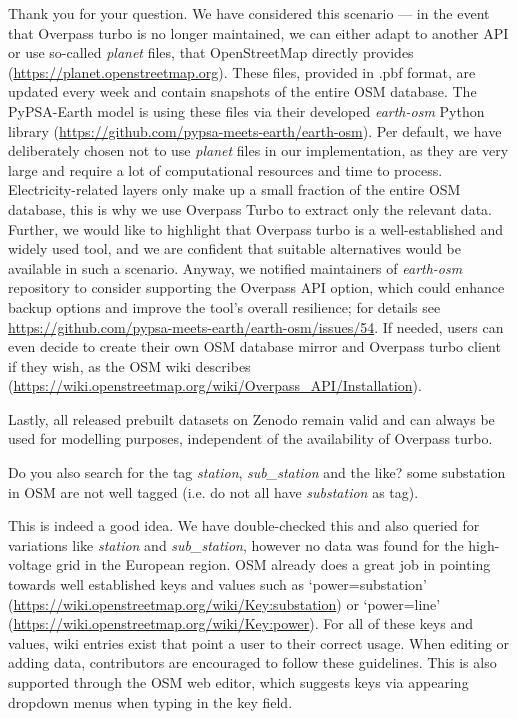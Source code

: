 \documentclass{response}
\begin{document}
\AR Thank you for your question. We have considered this scenario --- in the event that Overpass turbo is no longer maintained, we can either adapt to another API or use so-called \textit{planet} files, that OpenStreetMap directly provides (\href{https://planet.openstreetmap.org}{https://planet.openstreetmap.org}). These files, provided in .pbf format, are updated every week and contain snapshots of the entire OSM database. The PyPSA-Earth model is using these files via their developed \textit{earth-osm} Python library (\href{https://github.com/pypsa-meets-earth/earth-osm}{https://github.com/pypsa-meets-earth/earth-osm}). Per default, we have deliberately chosen not to use \textit{planet} files in our implementation, as they are very large and require a lot of computational resources and time to process. Electricity-related layers only make up a small fraction of the entire OSM database, this is why we use Overpass Turbo to extract only the relevant data. Further, we would like to highlight that Overpass turbo is a well-established and widely used tool, and we are confident that suitable alternatives would be available in such a scenario. Anyway, we notified maintainers of \textit{earth-osm} repository to consider supporting the Overpass API option, which could enhance backup options and improve the tool's overall resilience; for details see \href{https://github.com/pypsa-meets-earth/earth-osm/issues/54}{https://github.com/pypsa-meets-earth/earth-osm/issues/54}. If needed, users can even decide to create their own OSM database mirror and Overpass turbo client if they wish, as the OSM wiki describes (\href{https://wiki.openstreetmap.org/wiki/Overpass_API/Installation}{https://wiki.openstreetmap.org/wiki/Overpass\_API/Installation}). 

Lastly, all released prebuilt datasets on Zenodo \cite{xiongPrebuiltElectricityNetwork2024} remain valid and can always be used for modelling purposes, independent of the availability of Overpass turbo. 

\RC Do you also search for the tag \textit{station}, \textit{sub\_station} and the like? some substation in OSM are not well tagged (i.e. do not all have \textit{substation} as tag). 

\AR This is indeed a good idea. We have double-checked this and also queried for variations like \textit{station} and \textit{sub\_station}, however no data was found for the high-voltage grid in the European region. OSM already does a great job in pointing towards well established keys and values such as `power=substation' (\href{https://wiki.openstreetmap.org/wiki/Key:substation}{https://wiki.openstreetmap.org/wiki/Key:substation}) or `power=line' (\href{https://wiki.openstreetmap.org/wiki/Key:power}{https://wiki.openstreetmap.org/wiki/Key:power}). For all of these keys and values, wiki entries exist that point a user to their correct usage. When editing or adding data, contributors are encouraged to follow these guidelines. This is also supported through the OSM web editor, which suggests keys via appearing dropdown menus when typing in the key field.
\end{document}
